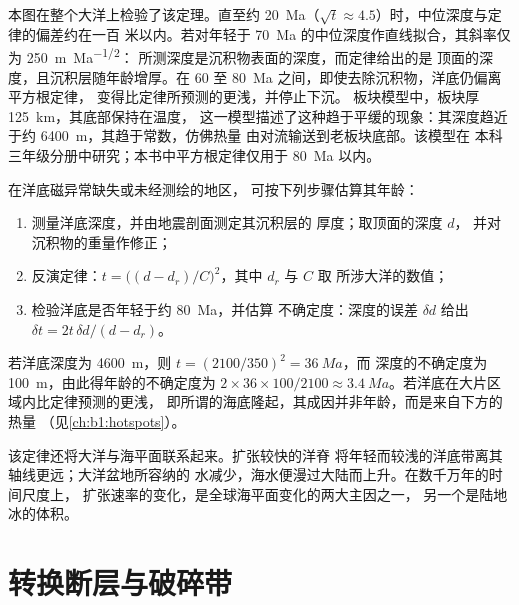 本图在整个大洋上检验了该定理。直至约
\qty{20}{Ma}（$\sqrt t \approx 4.5$）时，中位深度与定律的偏差约在一百
米以内。若对年轻于
\qty{70}{Ma} 的中位深度作直线拟合，其斜率仅为 \qty{250}{m.Ma^{-1/2}}：
所测深度是沉积物表面的深度，而定律给出的是
顶面的深度，且沉积层随年龄增厚。在 60 至
\qty{80}{Ma} 之间，即使去除沉积物，洋底仍偏离平方根定律，
变得比定律所预测的更浅，并停止下沉。
板块模型中，板块厚 \qty{125}{km}，其底部保持在温度，
这一模型描述了这种趋于平缓的现象：其深度趋近于约
\qty{6400}{m}，其趋于常数，仿佛热量
由对流输送到老板块底部。该模型在
本科三年级分册中研究；本书中平方根定律仅用于 \qty{80}{Ma} 以内。

\begin{method}[由深度确定洋底年龄]\label{met:b1:rifts-ridges-margins:age-from-depth}
在洋底磁异常缺失或未经测绘的地区，
可按下列步骤估算其年龄：
\begin{enumerate}
  \item 测量洋底深度，并由地震剖面测定其沉积层的
        厚度；取顶面的深度 $d$，
        并对沉积物的重量作修正；
  \item 反演定律：$t = \bigl((d - d_r)/C\bigr)^2$，其中 $d_r$ 与 $C$ 取
        所涉大洋的数值；
  \item 检验洋底是否年轻于约 \qty{80}{Ma}，并估算
        不确定度：深度的误差 $\delta d$ 给出
        $\delta t = 2t\,\delta d/(d - d_r)$。
\end{enumerate}
\end{method}

若洋底深度为 \qty{4600}{m}，则 $t = (2100/350)^2 = \qty{36}{Ma}$，而
深度的不确定度为 \qty{100}{m}，由此得年龄的不确定度为 $2\times36\times100/2100 \approx
\qty{3.4}{Ma}$。若洋底在大片区域内比定律预测的更浅，
即所谓的海底隆起，其成因并非年龄，而是来自下方的热量
（见\cref{ch:b1:hotspots}）。

该定律还将大洋与海平面联系起来。扩张较快的洋脊
将年轻而较浅的洋底带离其轴线更远；大洋盆地所容纳的
水减少，海水便漫过大陆而上升。在数千万年的时间尺度上，
扩张速率的变化，是全球海平面变化的两大主因之一，
另一个是陆地冰的体积。

\section{转换断层与破碎带}

